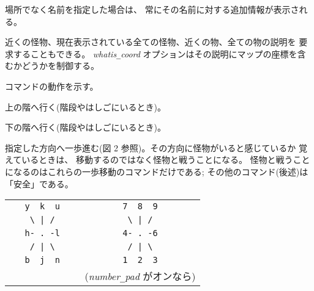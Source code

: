 場所でなく名前を指定した場合は、
常にその名前に対する追加情報が表示される。

近くの怪物、現在表示されている全ての怪物、近くの物、全ての物の説明を
要求することもできる。
{\it whatis\verb+_+coord\/}
オプションはその説明にマップの座標を含むかどうかを制御する。
\item[\tb{\&}]
コマンドの動作を示す。
\item[\tb{<}]
上の階へ行く(階段やはしごにいるとき)。
\item[\tb{>}]
下の階へ行く(階段やはしごにいるとき)。
\item[\tb{[yuhjklbn]}]
指定した方向へ一歩進む(図 2 参照)。その方向に怪物がいると感じているか
覚えているときは、
移動するのではなく怪物と戦うことになる。
怪物と戦うことになるのはこれらの一歩移動のコマンドだけである;
その他のコマンド(後述)は「安全」である。
\begin{center}
\begin{tabular}{cc}
\verb+   y  k  u   + & \verb+   7  8  9   +\\
\verb+    \ | /    + & \verb+    \ | /    +\\
\verb+   h- . -l   + & \verb+   4- . -6   +\\
\verb+    / | \    + & \verb+    / | \    +\\
\verb+   b  j  n   + & \verb+   1  2  3   +\\
                     & ({\it number\verb+_+pad\/} がオンなら)
\end{tabular}
\end{center}
